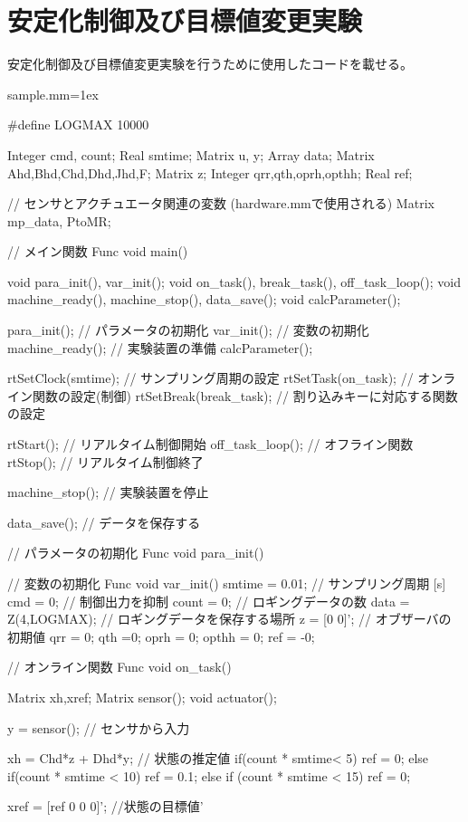 \section{安定化制御及び目標値変更実験}
	安定化制御及び目標値変更実験を行うために使用したコードを載せる。
	\begin{breakitembox}[l]{sample.mm}\baselineskip=1ex
		\begin{verbatimtab}[4]
#define LOGMAX 10000

Integer cmd, count;
Real smtime;
Matrix u, y;
Array data;
Matrix Ahd,Bhd,Chd,Dhd,Jhd,F;
Matrix z;
Integer qrr,qth,oprh,opthh;
Real ref;

// センサとアクチュエータ関連の変数 (hardware.mmで使用される)
Matrix mp_data, PtoMR;

// メイン関数
Func void main()
{
	void para_init(), var_init();
	void on_task(), break_task(), off_task_loop();
	void machine_ready(), machine_stop(), data_save();
	void calcParameter();

	para_init();			// パラメータの初期化
	var_init();             // 変数の初期化
	machine_ready();        // 実験装置の準備
	calcParameter();

	rtSetClock(smtime);     // サンプリング周期の設定
	rtSetTask(on_task);		// オンライン関数の設定(制御)
	rtSetBreak(break_task); // 割り込みキーに対応する関数の設定

	rtStart();              // リアルタイム制御開始
	off_task_loop();        // オフライン関数
	rtStop();               // リアルタイム制御終了

	machine_stop();         // 実験装置を停止

	data_save();			// データを保存する
}

// パラメータの初期化
Func void para_init()
{
}

// 変数の初期化
Func void var_init()
{
	smtime = 0.01;		// サンプリング周期 [s]
	cmd = 0;			// 制御出力を抑制
	count = 0;			// ロギングデータの数
	data = Z(4,LOGMAX); // ロギングデータを保存する場所
	z = [0 0]';            // オブザーバの初期値
	qrr = 0;
	qth =0;
	oprh = 0;
	opthh = 0;
ref = -0;
}

// オンライン関数
Func void on_task()
{
	Matrix xh,xref;
	Matrix sensor();
	void actuator();

	y = sensor();				// センサから入力

	xh = Chd*z + Dhd*y; // 状態の推定値
	if(count * smtime< 5){
		ref = 0;
	} else if(count * smtime < 10){
		ref = 0.1;
	} else if (count * smtime < 15){
		ref = 0;
	}

	xref = [ref 0 0 0]'; //状態の目標値'
		
}
\end{verbatimtab}
\end{breakitembox}
